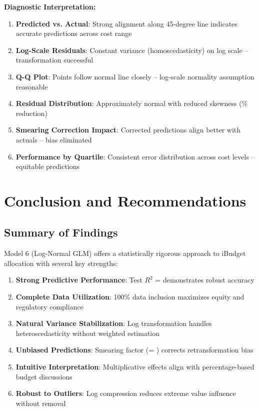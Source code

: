 \textbf{Diagnostic Interpretation:}

\begin{enumerate}
    \item \textbf{Predicted vs. Actual}: Strong alignment along 45-degree line indicates accurate predictions across cost range
    
    \item \textbf{Log-Scale Residuals}: Constant variance (homoscedasticity) on log scale -- transformation successful
    
    \item \textbf{Q-Q Plot}: Points follow normal line closely -- log-scale normality assumption reasonable
    
    \item \textbf{Residual Distribution}: Approximately normal with reduced skewness (\ModelSixSkewnessReduction{}\% reduction)
    
    \item \textbf{Smearing Correction Impact}: Corrected predictions align better with actuals -- bias eliminated
    
    \item \textbf{Performance by Quartile}: Consistent error distribution across cost levels -- equitable predictions
\end{enumerate}

\section{Conclusion and Recommendations}

\subsection{Summary of Findings}

Model 6 (Log-Normal GLM) offers a statistically rigorous approach to iBudget allocation with several key strengths:

\begin{enumerate}
    \item \textbf{Strong Predictive Performance}: Test $R^2$ = \ModelSixRSquaredTest{} demonstrates robust accuracy
    
    \item \textbf{Complete Data Utilization}: 100\% data inclusion maximizes equity and regulatory compliance
    
    \item \textbf{Natural Variance Stabilization}: Log transformation handles heteroscedasticity without weighted estimation
    
    \item \textbf{Unbiased Predictions}: Smearing factor (= \ModelSixSmearingFactor{}) corrects retransformation bias
    
    \item \textbf{Intuitive Interpretation}: Multiplicative effects align with percentage-based budget discussions
    
    \item \textbf{Robust to Outliers}: Log compression reduces extreme value influence without removal
\end{enumerate}

